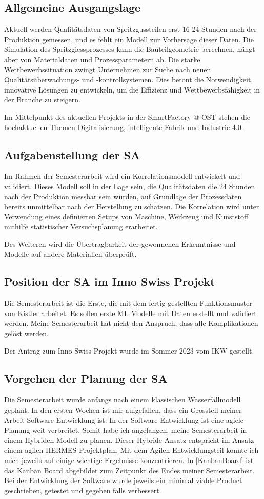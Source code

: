 \subsection{Allgemeine Ausgangslage}
Aktuell werden Qualitätsdaten von Spritzgussteilen erst 16-24 Stunden nach der Produktion gemessen, und es fehlt ein Modell zur Vorhersage dieser Daten. Die Simulation des Spritzgiessprozesses kann die Bauteilgeometrie berechnen, hängt aber von Materialdaten und Prozessparametern ab. Die starke Wettbewerbssituation zwingt Unternehmen zur Suche nach neuen Qualitätsüberwachungs- und -kontrollsystemen. Dies betont die Notwendigkeit, innovative Lösungen zu entwickeln, um die Effizienz und Wettbewerbsfähigkeit in der Branche zu steigern.

Im Mittelpunkt des aktuellen Projekts in der SmartFactory @ OST stehen die hochaktuellen Themen Digitalisierung, intelligente Fabrik und Industrie 4.0.

\subsection{Aufgabenstellung der SA}
Im Rahmen der Semesterarbeit wird ein Korrelationsmodell entwickelt und validiert. Dieses Modell soll in der Lage sein, die Qualitätsdaten die 24 Stunden nach der Produktion messbar sein würden, auf Grundlage der Prozessdaten bereits unmittelbar nach der Herstellung zu schätzen. Die Korrelation wird unter Verwendung eines definierten Setups von Maschine, Werkzeug und Kunststoff mithilfe statistischer Versuchsplanung erarbeitet.

Des Weiteren wird die Übertragbarkeit der gewonnenen Erkenntnisse und Modelle auf andere Materialien überprüft.

\subsection{Position der SA im Inno Swiss Projekt}
Die Semesterarbeit ist die Erste, die mit dem fertig gestellten Funktionsmuster von Kistler arbeitet. Es sollen erste ML Modelle mit Daten erstellt und validiert werden. Meine Semesterarbeit hat nicht den Anspruch, dass alle Komplikationen gelöst werden.

Der Antrag zum Inno Swiss Projekt wurde im Sommer 2023 vom IKW gestellt.

\subsection{Vorgehen der Planung der SA}
Die Semesterarbeit wurde anfangs nach einem klassischen Wasserfallmodell geplant. In den ersten Wochen ist mir aufgefallen, dass ein Grossteil meiner Arbeit Software Entwicklung ist. In der Software Entwicklung ist eine agiele Planung weit verbreitet. Somit habe ich angefangen, meine Semesterarbeit in einem Hybriden Modell zu planen. Dieser Hybride Ansatz entspricht im Ansatz einem agilen HERMES Projektplan. Mit dem Agilen Entwicklungsteil konnte ich mich jeweils auf einige wichtige Ergebnisse konzentrieren. In \ref{KanbanBoard} ist das Kanban Board abgebildet zum Zeitpunkt des Endes meiner Semesterarbeit. Bei der Entwicklung der Software wurde jeweils ein minimal viable Product geschrieben, getestet und gegeben falls verbessert.


